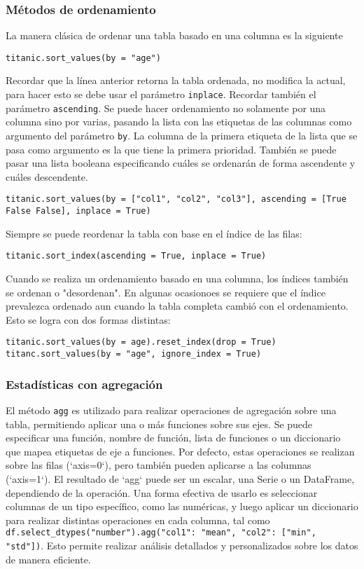 \subsubsection{Métodos de ordenamiento}
\noindent La manera clásica de ordenar una tabla basado en una columna es la siguiente
\begin{verbatim}
titanic.sort_values(by = "age")
\end{verbatim}
Recordar que la línea anterior retorna la tabla ordenada, no modifica la actual, para hacer esto se debe usar el parámetro \texttt{inplace}. Recordar también el parámetro \texttt{ascending}.
\noindent Se puede hacer ordenamiento no solamente por una columna sino por varias, pasando la lista con las etiquetas de las columnas como argumento del parámetro \texttt{by}. La columna de la primera etiqueta de la lista que se pasa como argumento es la que tiene la primera prioridad. También se puede pasar una lista booleana especificando cuáles se ordenarán de forma ascendente y cuáles descendente.
\begin{verbatim}
titanic.sort_values(by = ["col1", "col2", "col3"], ascending = [True False False], inplace = True)
\end{verbatim}
\noindent Siempre se puede reordenar la tabla con base en el índice de las filas:
\begin{verbatim}
titanic.sort_index(ascending = True, inplace = True)
\end{verbatim}
Cuando se realiza un ordenamiento basado en una columna, los índices también se ordenan o "desordenan". En algunas ocasionoes se requiere que el índice prevalezca ordenado aun cuando la tabla completa cambió con el ordenamiento. Esto se logra con dos formas distintas:
\begin{verbatim}
titanic.sort_values(by = age).reset_index(drop = True)
titanc.sort_values(by = "age", ignore_index = True)
\end{verbatim}
\subsubsection{Estadísticas con agregación}
El método \texttt{agg} es utilizado para realizar operaciones de agregación sobre una tabla, permitiendo aplicar una o más funciones sobre sus ejes. Se puede especificar una función, nombre de función, lista de funciones o un diccionario que mapea etiquetas de eje a funciones. Por defecto, estas operaciones se realizan sobre las filas (`axis=0`), pero también pueden aplicarse a las columnas (`axis=1`). El resultado de `agg` puede ser un escalar, una Serie o un DataFrame, dependiendo de la operación. Una forma efectiva de usarlo es seleccionar columnas de un tipo específico, como las numéricas, y luego aplicar un diccionario para realizar distintas operaciones en cada columna, tal como \texttt{df.select\_dtypes("number").agg({"col1": "mean", "col2": ["min", "std"]})}. Esto permite realizar análisis detallados y personalizados sobre los datos de manera eficiente.
